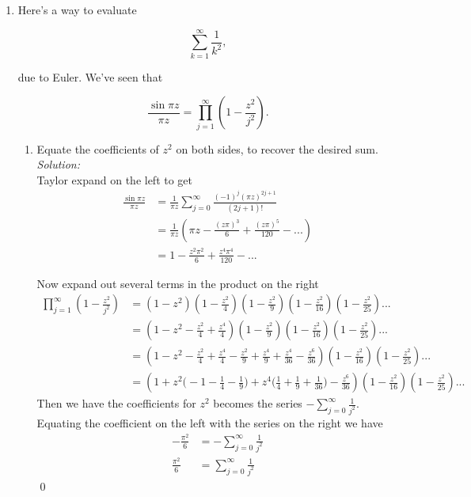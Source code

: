 \documentclass[10pt]{amsart}
\theoremstyle{nonumberplain}
\begin{document}
\begin{enumerate}[label={\bf {\arabic*}:}]
\newpage

\item Here's a way to evaluate

$$
\sum_{k=1}^{\infty} \frac{1}{k^2},
$$

due to Euler. We've seen that

$$
\frac{\sin \pi z}{\pi z} = \prod_{j=1}^{\infty}\left(1-\frac{z^2}{j^2}\right) .
$$

\begin{enumerate}
\item Equate the coefficients of $z^2$ on both sides, to recover the desired sum. \\

\noindent
\textit{Solution:} \\
Taylor expand on the left to get
\begin{align*}
\frac{\sin \pi z}{\pi z} &= \frac 1 {\pi z} \sum_{j=0}^\infty \frac {(-1)^j (\pi z)^{2j + 1}}{(2j + 1)!} \\
	&= \frac 1 {\pi z} \left(\pi z -\frac {(z \pi)^3}{6} + \frac{(z \pi)^5}{120} - ... \right) \\
	&= 1 -\frac {z^2 \pi^2}{6} + \frac{z^4 \pi^4}{120} - ... 
\end{align*}

Now expand out several terms in the product on the right
\begin{align*}
\prod_{j=1}^{\infty}\left(1-\frac{z^2}{j^2}\right)
	&= \left( 1 - z^2\right)\left( 1 - \frac{z^2}{4}\right)\left( 1 - \frac{z^2}{9}\right)\left( 1 - \frac{z^2}{16}\right)\left( 1 - \frac{z^2}{25}\right)... \\
	&= \left( 1 - z^2 - \frac{z^2}{4} + \frac{z^4}{4} \right)\left( 1 - \frac{z^2}{9}\right)\left( 1 - \frac{z^2}{16}\right)\left( 1 - \frac{z^2}{25}\right)... \\
	&= \left( 1 - z^2 - \frac{z^2}{4} + \frac{z^4}{4} - \frac{z^2}{9} + \frac{z^4}{9} + \frac{z^4}{36} -\frac{z^6}{36} \right)\left( 1 - \frac{z^2}{16}\right)\left( 1 - \frac{z^2}{25}\right)... \\
	&= \left( 1 + z^2\Big( -1 - \frac 1 4 - \frac 1 9\Big) + z^4 \Big( \frac 1 {4} + \frac 1 {9} + \frac 1 {36} \Big) - \frac{z^6}{36} \right)\left( 1 - \frac{z^2}{16}\right)\left( 1 - \frac{z^2}{25}\right)...
\end{align*}
Then we have the coefficients for $z^2$ becomes the series $ - \sum_{j = 0}^\infty \frac 1 {j^2}. $
Equating the coefficient on the left with the series on the right we have
\begin{align*}
-\frac {\pi^2} 6 &= - \sum_{j = 0}^\infty \frac 1 {j^2} \\
\frac {\pi^2} 6 &= \sum_{j = 0}^\infty \frac 1 {j^2}
\end{align*} \qed \\


\end{enumerate}
\end{enumerate}
\end{document}
